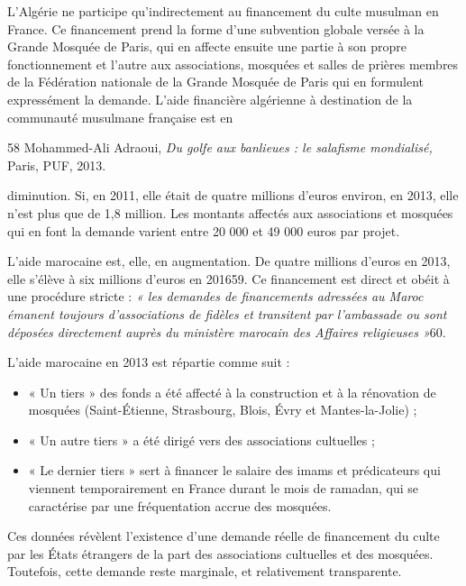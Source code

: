 L'Algérie ne participe qu'indirectement au financement du culte musulman
en France. Ce financement prend la forme d'une subvention globale versée
à la Grande Mosquée de Paris, qui en affecte ensuite une partie à son
propre fonctionnement et l'autre aux associations, mosquées et salles de
prières membres de la Fédération nationale de la Grande Mosquée de Paris
qui en formulent expressément la demande. L'aide financière algérienne à
destination de la communauté musulmane française est en

58 Mohammed-Ali Adraoui, \emph{Du golfe aux banlieues : le salafisme
mondialisé,} Paris, PUF, 2013.



diminution. Si, en 2011, elle était de quatre millions d'euros environ,
en 2013, elle n'est plus que de 1,8 million. Les montants affectés aux
associations et mosquées qui en font la demande varient entre 20 000 et
49 000 euros par projet.

L'aide marocaine est, elle, en augmentation. De quatre millions d'euros
en 2013, elle s'élève à six millions d'euros en 201659. Ce financement
est direct et obéit à une procédure stricte : \emph{« les demandes de
financements adressées au Maroc émanent toujours d'associations de
fidèles et transitent par l'ambassade ou sont déposées directement
auprès du ministère marocain des Affaires religieuses »}60.

L'aide marocaine en 2013 est répartie comme suit :


\begin{itemize}
\item
  « Un tiers » des fonds a été affecté à la construction et à la
  rénovation de mosquées (Saint-Étienne, Strasbourg, Blois, Évry et
  Mantes-la-Jolie) ;
\item
  « Un autre tiers » a été dirigé vers des associations cultuelles ;
\item
  
  « Le dernier tiers » sert à financer le salaire des imams et
  prédicateurs qui viennent temporairement en France durant le mois de
  ramadan, qui se caractérise par une fréquentation accrue des mosquées.
  
\end{itemize}


Ces données révèlent l'existence d'une demande réelle de financement du
culte par les États étrangers de la part des associations cultuelles et
des mosquées. Toutefois, cette demande reste marginale, et relativement
transparente.

